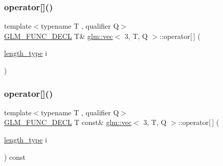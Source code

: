 \mbox{\label{structglm_1_1vec_3_013_00_01_t_00_01_q_01_4_a7f555e7e0581a8e53ac675fde684055b}} 
\subsubsection{\texorpdfstring{operator[]()}{operator[]()}\hspace{0.1cm}{\footnotesize\ttfamily [1/2]}}
{\footnotesize\ttfamily template$<$typename T , qualifier Q$>$ \\
\mbox{\hyperlink{setup_8hpp_ab2d052de21a70539923e9bcbf6e83a51}{G\+L\+M\+\_\+\+F\+U\+N\+C\+\_\+\+D\+E\+CL}} T\& \mbox{\hyperlink{structglm_1_1vec}{glm\+::vec}}$<$ 3, T, Q $>$\+::operator\mbox{[}$\,$\mbox{]} (\begin{DoxyParamCaption}\item[{\mbox{\hyperlink{structglm_1_1vec_3_013_00_01_t_00_01_q_01_4_ab586a87f82719bfdd180336a98843257}{length\+\_\+type}}}]{i }\end{DoxyParamCaption})}

\mbox{\label{structglm_1_1vec_3_013_00_01_t_00_01_q_01_4_a361188d270506795b9a46c2fc2857e69}} 
\subsubsection{\texorpdfstring{operator[]()}{operator[]()}\hspace{0.1cm}{\footnotesize\ttfamily [2/2]}}
{\footnotesize\ttfamily template$<$typename T , qualifier Q$>$ \\
\mbox{\hyperlink{setup_8hpp_ab2d052de21a70539923e9bcbf6e83a51}{G\+L\+M\+\_\+\+F\+U\+N\+C\+\_\+\+D\+E\+CL}} T const\& \mbox{\hyperlink{structglm_1_1vec}{glm\+::vec}}$<$ 3, T, Q $>$\+::operator\mbox{[}$\,$\mbox{]} (\begin{DoxyParamCaption}\item[{\mbox{\hyperlink{structglm_1_1vec_3_013_00_01_t_00_01_q_01_4_ab586a87f82719bfdd180336a98843257}{length\+\_\+type}}}]{i }\end{DoxyParamCaption}) const}

